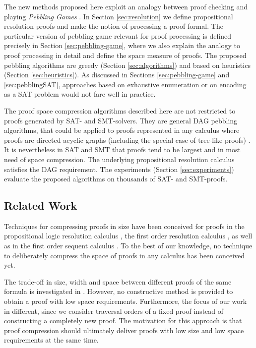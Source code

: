 The new methods proposed here exploit an analogy between proof checking and playing \emph{Pebbling Games} \cite{Kasai1979,Gilbert1980}.
In Section \ref{sec:resolution} we define propositional resolution proofs and make the notion of processing a proof formal.
The particular version of pebbling game relevant for proof processing is defined precisely in Section \ref{sec:pebbling-game}, where we also explain the analogy to proof processing in detail and define the space measure of proofs. The proposed pebbling algorithms are greedy (Section \ref{sec:algorithms}) and based on heuristics (Section \ref{sec:heuristics}). As discussed in Sections \ref{sec:pebbling-game} and \ref{sec:pebblingSAT}, approaches based on exhaustive enumeration or on encoding as a SAT problem would not fare well in practice.

The proof space compression algorithms described here are not restricted to proofs generated by SAT- and SMT-solvers. They are general DAG pebbling algorithms, that could be applied to proofs represented in any calculus where proofs are directed acyclic graphs (including the special case of tree-like proofs) \cite{APPA}. It is nevertheless in SAT and SMT that proofs tend to be largest and in most need of space compression. The underlying propositional resolution calculus satisfies the DAG requirement. The experiments (Section \ref{sec:experiments}) evaluate the proposed algorithms on thousands of SAT- and SMT-proofs.

\subsection{Related Work}

Techniques for compressing proofs in size have been conceived for proofs in the propositional logic resolution calculus \cite{cotton2010two,DBLP:conf/sat/Gupta12,DBLP:conf/tableaux/BoudouP13,DBLP:conf/hvc/BloemMSW14}, the first order resolution calculus \cite{DBLP:conf/cade/GorznyP15}, as well as in the first order sequent calculus \cite{BrunoLPAR,Hetzl}.
To the best of our knowledge, no technique to deliberately compress the space of proofs in any calculus has been conceived yet.

The trade-off in size, width and space between different proofs of the same formula is investigated in \cite{Ben-Sasson2002}.
However, no constructive method is provided to obtain a proof with low space requirements.
Furthermore, the focus of our work in different, since we consider traversal orders of a fixed proof instead of constructing a completely new proof.
The motivation for this approach is that proof compression should ultimately deliver proofs with low size and low space requirements at the same time.

